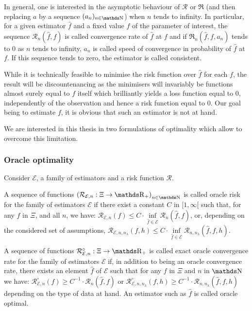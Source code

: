 In general, one is interested in the asymptotic behaviour of $\mathcal{R}$ or $\mathfrak{R}$ (and then replacing $a$ by a sequence $(a_{n})_{n \in \N}$) when $n$ tends to infinity.
In particular, for a given estimator $\widehat{f}$ and a fixed value $f$ of the parameter of interest, the sequence $\mathcal{R}_{n}(\widehat{f}, f)$ is called convergence rate of $\widehat{f}$ at $f$ and if $\mathfrak{R}_{n}(\widehat{f}, f, a_{n})$ tends to $0$ as $n$ tends to infinity, $a_{n}$ is called speed of convergence in probability of $\widehat{f}$ at $f$.
If this sequence tends to zero, the estimator is called consistent.

\medskip

While it is technically feasible to minimise the risk function over $\widehat{f}$ for each $f$, the result will be discountenancing as the minimisers will invariably be functions almost surely equal to $f$ itself which brilliantly yields a loss function equal to $0$, independently of the observation and hence a risk function equal to $0$.
Our goal being to estimate $f$, it is obvious that such an estimator is not at hand.

We are interested in this thesis in two formulations of optimality which allow to overcome this limitation.

\subsubsection{Oracle optimality}\label{INTRO_FREQ_DECISION_ORACLEOPT}
Consider $\mathcal{E}$, a family of estimators and a risk function $\mathcal{R}$.

\begin{de}\label{DE_INTRO_FREQ_DECISION_ORACLEOPT_CONVRATE}
A sequence of functions $\left(\mathcal{R}_{\mathcal{E}, n} : \Xi \rightarrow \R_{+}\right)_{n \in \N}$ is called oracle risk for the family of estimators $\mathcal{E}$ if there exist a constant $C$ in $[1, \infty[$ such that, for any $f$ in $\Xi$, and all $n$, we have: $\mathcal{R}_{\mathcal{E}, n}(f) \leq C \cdot \inf\limits_{\widehat{f} \in \mathcal{E}} \mathcal{R}_{n}(\widehat{f}, f)$, or, depending on the considered set of assumptions, $\mathcal{R}_{\mathcal{E}, n, n_{\lambda}}(f, h) \leq C \cdot \inf\limits_{\widehat{f} \in \mathcal{E}} \mathcal{R}_{n, n_{\lambda}}(\widehat{f}, f, h)$.
\assEnd
\end{de}

\begin{de}\label{DE_INTRO_FREQ_DECISION_ORACLEOPT_EXACTCONVRATE}
A sequence of functions $\mathcal{R}^{\circ}_{\mathcal{E}, n} : \Xi \rightarrow \R_{+}$ is called exact oracle convergence rate for the family of estimators $\mathcal{E}$ if, in addition to being an oracle convergence rate, there exists an element $\widehat{f}$ of $\mathcal{E}$ such that for any $f$ in $\Xi$ and $n$ in $\N$ we have: $\mathcal{R}^{\circ}_{\mathcal{E}, n}(f) \geq C^{-1} \cdot \mathcal{R}_{n}(\widehat{f}, f)$ or $\mathcal{R}^{\circ}_{\mathcal{E}, n, n_{\lambda}}(f, h) \geq C^{-1} \cdot \mathcal{R}_{n, n_{\lambda}}(\widehat{f}, f, h)$ depending on the type of data at hand.
An estimator such as $\widehat{f}$ is called oracle optimal.
\assEnd
\end{de}

